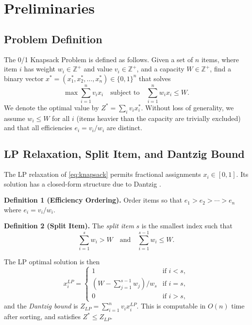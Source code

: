 \documentclass[conference]{IEEEtran}
\begin{document}
\section{Preliminaries}

\subsection{Problem Definition}

The 0/1 Knapsack Problem is defined as follows. Given a set of $n$ items, where item $i$ has weight $w_i \in \mathbb{Z}^+$ and value $v_i \in \mathbb{Z}^+$, and a capacity $W \in \mathbb{Z}^+$, find a binary vector $x^* = (x_1^*, x_2^*, \ldots, x_n^*) \in \{0,1\}^n$ that solves
\begin{equation}
    \max \sum_{i=1}^{n} v_i x_i \quad \text{subject to} \quad \sum_{i=1}^{n} w_i x_i \leq W.
    \label{eq:knapsack}
\end{equation}
We denote the optimal value by $Z^* = \sum_{i} v_i x_i^*$. Without loss of generality, we assume $w_i \leq W$ for all $i$ (items heavier than the capacity are trivially excluded) and that all efficiencies $e_i = v_i / w_i$ are distinct.

\subsection{LP Relaxation, Split Item, and Dantzig Bound}

The LP relaxation of \eqref{eq:knapsack} permits fractional assignments $x_i \in [0,1]$. Its solution has a closed-form structure due to Dantzig \cite{ref1}.

\textbf{Definition 1 (Efficiency Ordering).} Order items so that $e_1 > e_2 > \cdots > e_n$ where $e_i = v_i / w_i$.

\textbf{Definition 2 (Split Item).} The \textit{split item} $s$ is the smallest index such that
\begin{equation}
    \sum_{i=1}^{s} w_i > W \quad \text{and} \quad \sum_{i=1}^{s-1} w_i \leq W.
    \label{eq:split}
\end{equation}

The LP optimal solution is then
\begin{equation}
    x_i^{LP} = \begin{cases}
    1 & \text{if } i < s, \\
    (W - \sum_{j=1}^{s-1} w_j) / w_s & \text{if } i = s, \\
    0 & \text{if } i > s,
    \end{cases}
    \label{eq:lpsol}
\end{equation}
and the \textit{Dantzig bound} is $Z_{LP} = \sum_{i=1}^{n} v_i x_i^{LP}$. This is computable in $O(n)$ time after sorting, and satisfies $Z^* \leq Z_{LP}$.
\end{document}
